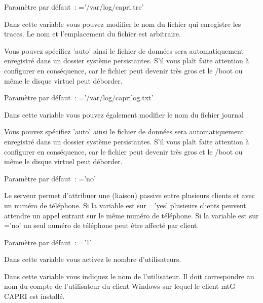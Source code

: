 \begin{description}
        Paramètre par défaut~: ='/var/log/capri.trc'

        Dans cette variable vous pouvez modifier le nom du fichier qui enregistre les traces.
		Le nom et l'emplacement du fichier est arbitraire.

        Vous pouvez spécifiez 'auto' ainsi le fichier de données sera automatiquement enregistré
		dans un dossier système persistantes.
		S'il vous plaît faite attention à configurer  en conséquence, car
		le fichier peut devenir très gros et le /boot ou même le disque virtuel peut déborder.


        Paramètre par défaut~: ='/var/log/caprilog.txt'

        Dans cette variable vous pouvez également modifier le nom du fichier journal

        Vous pouvez spécifiez 'auto' ainsi le fichier de données sera automatiquement enregistré
		dans un dossier système persistantes.
		S'il vous plaît faite attention à configurer  en conséquence, car
		le fichier peut devenir très gros et le /boot ou même le disque virtuel peut déborder.


        Paramètre par défaut~: ='no'

        Le serveur permet d'attribuer une (liaison) passive entre plusieurs clients et
		avec un numéro de téléphone. Si la variable est sur ='yes'
		plusieurs clients peuvent attendre un appel entrant sur le même numéro de téléphone.
		Si la variable est sur ='no' un seul numéro de téléphone
		peut être affecté par client.


        Paramètre par défaut~: ='1'

        Dans cette variable vous activez le nombre d'utilisateurs.


        Dans cette variable vous indiquez le nom de l'utilisateur. Il doit correspondre au nom
		du compte de l'utilisateur du client Windows sur lequel le client mtG CAPRI est installé.


\end{description}
